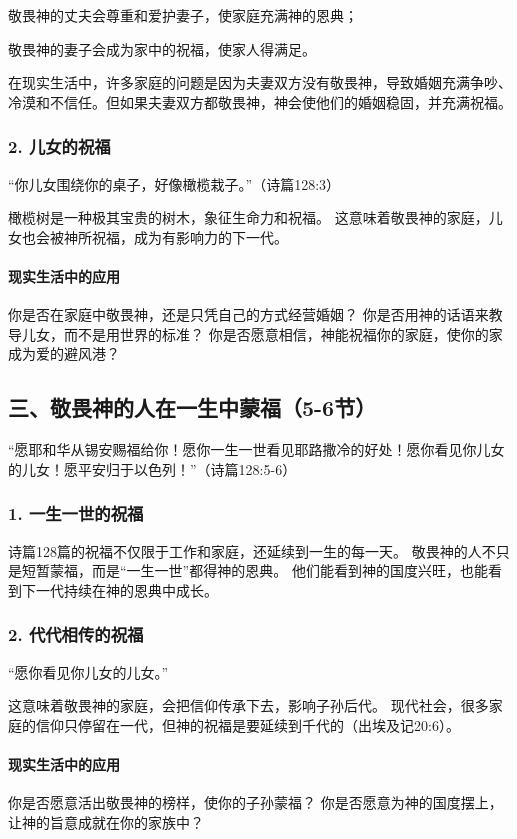 \documentclass[a4paper, 12pt]{article}
\begin{document}
敬畏神的丈夫会尊重和爱护妻子，使家庭充满神的恩典；

敬畏神的妻子会成为家中的祝福，使家人得满足。

在现实生活中，许多家庭的问题是因为夫妻双方没有敬畏神，导致婚姻充满争吵、冷漠和不信任。但如果夫妻双方都敬畏神，神会使他们的婚姻稳固，并充满祝福。

\subsubsection*{2. 儿女的祝福}
“你儿女围绕你的桌子，好像橄榄栽子。”（诗篇128:3）

橄榄树是一种极其宝贵的树木，象征生命力和祝福。
这意味着敬畏神的家庭，儿女也会被神所祝福，成为有影响力的下一代。
\paragraph*{现实生活中的应用}

你是否在家庭中敬畏神，还是只凭自己的方式经营婚姻？
你是否用神的话语来教导儿女，而不是用世界的标准？
你是否愿意相信，神能祝福你的家庭，使你的家成为爱的避风港？
\subsection*{三、敬畏神的人在一生中蒙福（5-6节）}
“愿耶和华从锡安赐福给你！愿你一生一世看见耶路撒冷的好处！愿你看见你儿女的儿女！愿平安归于以色列！”（诗篇128:5-6）

\subsubsection*{1. 一生一世的祝福}
诗篇128篇的祝福不仅限于工作和家庭，还延续到一生的每一天。
敬畏神的人不只是短暂蒙福，而是“一生一世”都得神的恩典。
他们能看到神的国度兴旺，也能看到下一代持续在神的恩典中成长。
\subsubsection*{2. 代代相传的祝福}
“愿你看见你儿女的儿女。”

这意味着敬畏神的家庭，会把信仰传承下去，影响子孙后代。
现代社会，很多家庭的信仰只停留在一代，但神的祝福是要延续到千代的（出埃及记20:6）。
\paragraph*{现实生活中的应用}

你是否愿意活出敬畏神的榜样，使你的子孙蒙福？
你是否愿意为神的国度摆上，让神的旨意成就在你的家族中？
\end{document}
